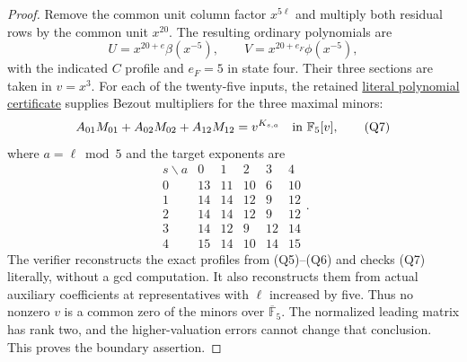 \documentclass[11pt]{article}
\begin{document}
\begin{proof}
Remove the common unit column factor $x^{5\ell}$ and multiply
both residual rows by the common unit $x^{20}$.
The resulting ordinary polynomials are
\[
 U=x^{20+e}\beta(x^{-5}),\qquad
 V=x^{20+e_F}\phi(x^{-5}),
\]
with the indicated $C$ profile and $e_F=5$ in state four.
Their three sections are taken in $v=x^3$.
For each of the twenty-five inputs, the retained
\href{arithmetic_frontier_quintic_boundary_profiles.json}
{literal polynomial certificate} supplies Bezout multipliers
for the three maximal minors:
\[
 A_{01}M_{01}+A_{02}M_{02}+A_{12}M_{12}=v^{K_{s,a}}
                  \quad\hbox{in }\mathbb F_5[v],        \tag{Q7}
\]
where $a=\ell\bmod5$ and the target exponents are
\[
 \begin{array}{c|ccccc}
 s\backslash a&0&1&2&3&4\\\hline
 0&13&11&10&6&10\\
 1&14&14&12&9&12\\
 2&14&14&12&9&12\\
 3&14&12&9&12&14\\
 4&15&14&10&14&15
 \end{array}.
\]
The verifier reconstructs the exact profiles from (Q5)--(Q6)
and checks (Q7) literally, without a gcd computation.
It also reconstructs them from actual auxiliary coefficients
at representatives with $\ell$ increased by five.
Thus no nonzero $v$ is a common zero of the minors over
$\overline{\mathbb F}_5$.
The normalized leading matrix has rank two, and the
higher-valuation errors cannot change that conclusion.
This proves the boundary assertion.
\end{proof}
\end{document}
